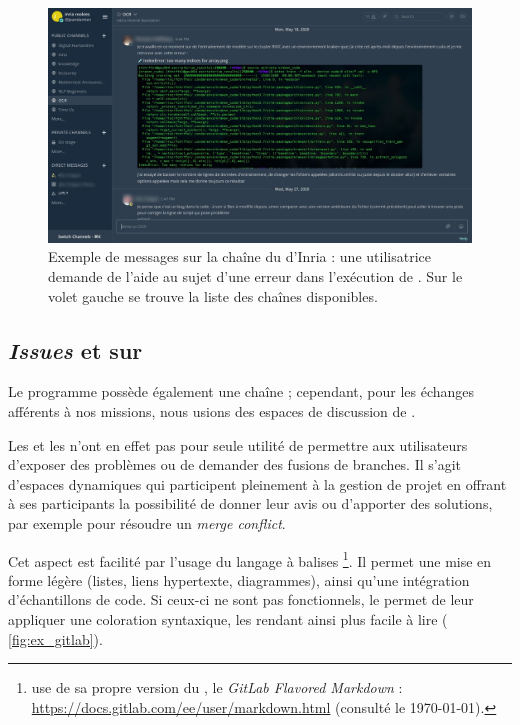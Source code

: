 \begin{figure}
    \centering
    \includegraphics[width=16cm]{img/mattermost.jpg}
    \caption[\Mattermost{}]{Exemple de messages sur la chaîne \og \ocr \fg{} du \Mattermost{} d'Inria : une utilisatrice demande de l'aide au sujet d'une erreur dans l'exécution de \kraken{}. Sur le volet gauche se trouve la liste des chaînes disponibles.}
    \label{fig:mattermost}
\end{figure}

\subsection{\textit{Issues} et \mergerequests{} sur \gitlab}

Le programme \timeus{} possède également une chaîne ; cependant, pour les échanges afférents à nos missions, nous usions des espaces de discussion de \gitlab.

Les \issues{} et les \mergerequests{} n'ont en effet pas pour seule utilité de permettre aux utilisateurs d'exposer des problèmes ou de demander des fusions de branches. Il s'agit d'espaces dynamiques qui participent pleinement à la gestion de projet en offrant à ses participants la possibilité de donner leur avis ou d'apporter des solutions, par exemple pour résoudre un \textit{merge conflict}.

Cet aspect est facilité par l'usage du langage à balises \markdown\footnote{\gitlab{} use de sa propre version du \markdown, le \textit{GitLab Flavored Markdown} : \url{https://docs.gitlab.com/ee/user/markdown.html} (consulté le \today).}. Il permet une mise en forme légère (listes, liens hypertexte, diagrammes), ainsi qu'une intégration d'échantillons de code. Si ceux-ci ne sont pas fonctionnels, le \markdown{} permet de leur appliquer une coloration syntaxique, les rendant ainsi plus facile à lire (\fig{} \ref{fig:ex_gitlab}).

